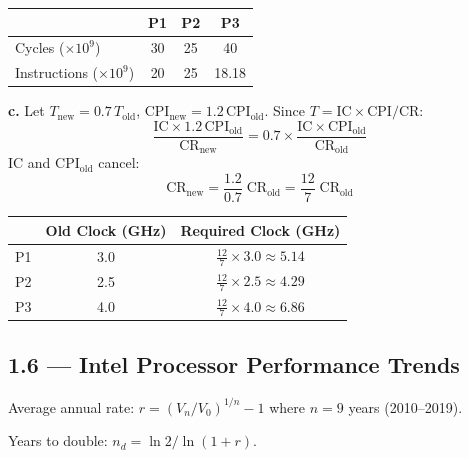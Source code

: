 \begin{center}
\begin{tabular}{lccc}
\toprule
& P1 & P2 & P3 \\
\midrule
Cycles ($\times 10^9$)       & 30   & 25    & 40 \\
Instructions ($\times 10^9$) & 20   & 25    & 18.18 \\
\bottomrule
\end{tabular}
\end{center}

\medskip\noindent\textbf{c.} Let $T_{\text{new}} = 0.7\,T_{\text{old}}$, \;
$\text{CPI}_{\text{new}} = 1.2\,\text{CPI}_{\text{old}}$.
Since $T = \text{IC} \times \text{CPI} / \text{CR}$:
\[
  \frac{\text{IC} \times 1.2\,\text{CPI}_{\text{old}}}{\text{CR}_{\text{new}}}
  = 0.7 \times \frac{\text{IC} \times \text{CPI}_{\text{old}}}{\text{CR}_{\text{old}}}
\]
IC and $\text{CPI}_{\text{old}}$ cancel:
\[
  \text{CR}_{\text{new}}
  = \frac{1.2}{0.7}\;\text{CR}_{\text{old}}
  = \frac{12}{7}\;\text{CR}_{\text{old}}
\]

\begin{center}
\begin{tabular}{lcc}
\toprule
& Old Clock (GHz) & Required Clock (GHz) \\
\midrule
P1 & 3.0 & $\frac{12}{7}\times 3.0 \approx 5.14$ \\
P2 & 2.5 & $\frac{12}{7}\times 2.5 \approx 4.29$ \\
P3 & 4.0 & $\frac{12}{7}\times 4.0 \approx 6.86$ \\
\bottomrule
\end{tabular}
\end{center}

\subsection*{1.6 --- Intel Processor Performance Trends}
\hypertarget{sol-1.6}{}

Average annual rate: $r = (V_n / V_0)^{1/n} - 1$ where $n = 9$ years (2010--2019).

Years to double: $n_d = \ln 2 / \ln(1 + r)$.

